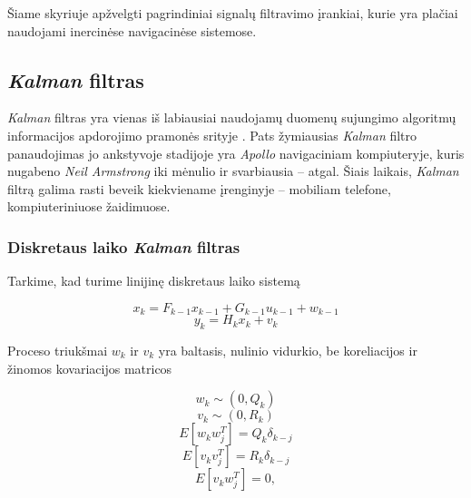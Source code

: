 Šiame skyriuje apžvelgti pagrindiniai signalų filtravimo įrankiai, kurie yra plačiai naudojami inercinėse navigacinėse sistemose.

\subsection{\textit{Kalman} filtras}

    \textit{Kalman} filtras \cite{kalman1960new} yra vienas iš labiausiai naudojamų duomenų sujungimo algoritmų informacijos apdorojimo pramonės srityje \cite{faragher2012understanding}. 
    Pats žymiausias \textit{Kalman} filtro panaudojimas jo ankstyvoje stadijoje yra \textit{Apollo} navigaciniam kompiuteryje, kuris nugabeno \textit{Neil Armstrong} iki mėnulio ir svarbiausia -- atgal. 
    Šiais laikais, \textit{Kalman} filtrą galima rasti beveik kiekviename įrenginyje -- mobiliam telefone, kompiuteriniuose žaidimuose.

    \subsubsection{Diskretaus laiko \textit{Kalman} filtras}

    Tarkime, kad turime linijinę diskretaus laiko sistemą

    \begin{equation}
        x_k = F_{k-1}x_{k-1} + G_{k-1}u_{k-1} + w_{k-1}
    \end{equation}
    \begin{equation}
        y_k = H_k x_k + v_k
    \end{equation}

    Proceso triukšmai ${w_k}$ ir ${v_k}$ yra baltasis, nulinio vidurkio, be koreliacijos ir žinomos kovariacijos matricos

    \begin{equation}
    w_k \sim (0, Q_k)
    \end{equation}
    \begin{equation}
    v_k \sim (0, R_k)
    \end{equation}
    \begin{equation}
    E[w_k w_j^T] = Q_k \delta_{k-j}
    \end{equation}
    \begin{equation}
    E[v_k v_j^T] = R_k\delta_{k-j}
    \end{equation}
    \begin{equation}
    E[v_k w_j^T] = 0,
    \end{equation}

